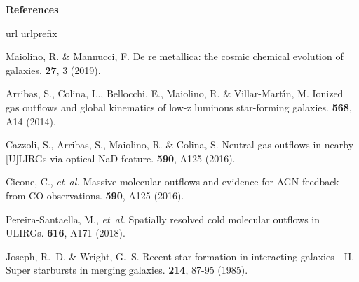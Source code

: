 \documentclass{nature2}
\begin{document}
\begin{center}
\bf{\large References}
\end{center}
\begin{thebibliography}{100}
\expandafter\ifx\csname url\endcsname\relax
  \def\url#1{\texttt{#1}}\fi
\expandafter\ifx\csname urlprefix\endcsname\relax\def\urlprefix{URL }\fi
\providecommand{\bibinfo}[2]{#2}
\providecommand{\eprint}[2][]{\url{#2}}

\bibinfo{author}{Maiolino, R.} \& \bibinfo{author}{Mannucci, F.}
\newblock De re metallica: the cosmic chemical evolution of galaxies.
\newblock \emph{\bibinfo{journal}{\aapr}} \textbf{\bibinfo{volume}{27}},
\bibinfo{pages}{3} (\bibinfo{year}{2019}).

\bibinfo{author}{Arribas, S.}, \bibinfo{author}{Colina, L.}, \bibinfo{author}{Bellocchi, E.}, \bibinfo{author}{Maiolino, R.} \& \bibinfo{author}{Villar-Mart{\'\i}n, M.}
\newblock Ionized gas outflows and global kinematics of low-z luminous star-forming galaxies.
\newblock \emph{\bibinfo{journal}{\aap}} \textbf{\bibinfo{volume}{568}},
\bibinfo{pages}{A14} (\bibinfo{year}{2014}).

\bibinfo{author}{Cazzoli, S.}, \bibinfo{author}{Arribas, S.}, \bibinfo{author}{Maiolino, R.} \& \bibinfo{author}{Colina, S.}
\newblock Neutral gas outflows in nearby [U]LIRGs via optical NaD feature.
\newblock \emph{\bibinfo{journal}{\aap}} \textbf{\bibinfo{volume}{590}},
\bibinfo{pages}{A125} (\bibinfo{year}{2016}).

\bibinfo{author}{Cicone, C.}, \emph{et~al.}
\newblock Massive molecular outflows and evidence for AGN feedback from CO observations.
\newblock \emph{\bibinfo{journal}{\aap}} \textbf{\bibinfo{volume}{590}},
\bibinfo{pages}{A125} (\bibinfo{year}{2016}).

\bibinfo{author}{Pereira-Santaella, M.}, \emph{et~al.}
\newblock Spatially resolved cold molecular outflows in ULIRGs.
\newblock \emph{\bibinfo{journal}{\aap}} \textbf{\bibinfo{volume}{616}},
\bibinfo{pages}{A171} (\bibinfo{year}{2018}).

\bibinfo{author}{Joseph, R.~D.} \& \bibinfo{author}{Wright, G.~S.}
\newblock Recent star formation in interacting galaxies - II. Super starbursts in merging galaxies.
\newblock \emph{\bibinfo{journal}{\mnras}} \textbf{\bibinfo{volume}{214}},
\bibinfo{pages}{87-95} (\bibinfo{year}{1985}).


\end{thebibliography}
\end{document}
